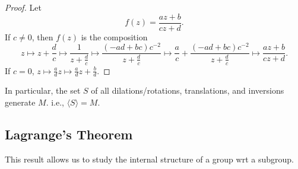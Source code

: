 \documentclass[a4paper]{article}
\begin{document}
    \begin{proof}
        Let
        \[
            f(z)=\frac{az+b}{cz+d}
        .\]
        If $c\neq 0$, then $ f(z) $ is the composition 
        \[
            z \mapsto z+\frac{d}{c} \mapsto \frac{1}{z+\frac{d}{c}} \mapsto \frac{(-ad+bc)c^{-2}}{z+\frac{d}{c}} \mapsto \frac{a}{c}+\frac{(-ad+bc)c^{-2}}{z+\frac{d}{c}} \mapsto \frac{az+b}{cz+d}
        .\]
        If $c=0$, $ z \mapsto \frac{a}{d}z \mapsto \frac{a}{d}z+\frac{b}{d}. $
    \end{proof}
    In particular, the set $S$ of all dilations/rotations, translations, and inversions generate $M$. i.e., $ \langle S \rangle = M $.
    \subsection{Lagrange's Theorem}
    This result allows us to study the internal structure of a group wrt a subgroup.
\end{document}
